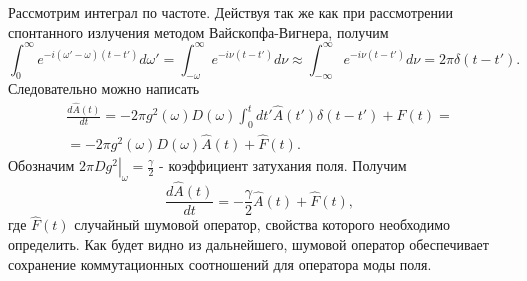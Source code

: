 Рассмотрим интеграл по частоте. Действуя так же как при рассмотрении
спонтанного излучения методом Вайскопфа-Вигнера, получим
\begin{equation}
\int_0^{\infty}e^{- i\left(\omega' -
  \omega\right)\left(t - t'\right)} d \omega' = 
\int_{-\omega}^{\infty} e^{-i \nu \left(t - t'\right)} d \nu \approx 
\int_{-\infty}^{\infty} e^{-i \nu \left(t - t'\right)} d \nu = 
2 \pi \delta\left(t - t'\right).
\nonumber
\end{equation}
Следовательно можно написать
\begin{eqnarray}
\frac{d \hat{A}\left(t\right)}{d t} = 
- 2 \pi g^2\left(\omega\right) 
D\left(\omega\right)
\int_0^t d t'
  \hat{A}\left(t'\right)
\delta\left(t - t'\right)  + \hat{F}\left(t\right) = 
\nonumber \\
=
- 2 \pi g^2\left(\omega\right) 
D\left(\omega\right) \hat{A}\left(t\right)
 + \hat{F}\left(t\right).
\nonumber
\end{eqnarray}
 Обозначим 
\(
\left.2 \pi D g^2\right|_{\omega} = \frac{\gamma}{2}
\) - коэффициент затухания поля. Получим
\begin{equation}
\frac{d \hat{A}\left(t\right)}{d t} = 
- \frac{\gamma}{2} \hat{A}\left(t\right) + 
\hat{F}\left(t\right),
\label{eqPart1Ch2_LanzgevenAeq}
\end{equation}
где $\hat{F}\left(t\right)$ случайный шумовой оператор, свойства
которого необходимо определить. Как будет видно из дальнейшего,
шумовой оператор обеспечивает сохранение коммутационных соотношений для
оператора моды поля.

